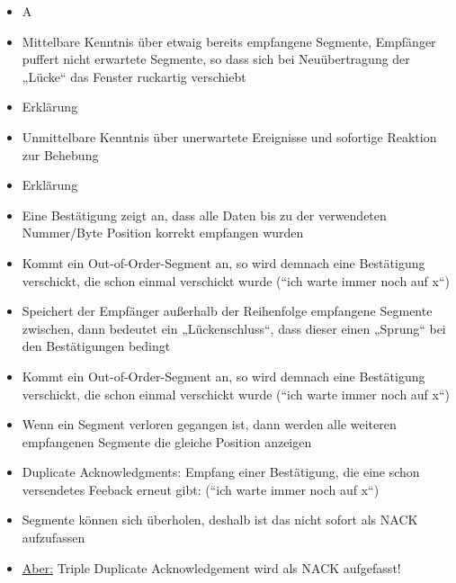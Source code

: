 \begin{itemize}
    \item \todo A
\end{itemize}

\begin{itemize}
    \item Mittelbare Kenntnis über etwaig bereits empfangene Segmente, Empfänger puffert nicht erwartete Segmente, so dass sich bei Neuübertragung der „Lücke“ das Fenster ruckartig verschiebt
    \item \todo Erklärung
\end{itemize}

\begin{itemize}
    \item Unmittelbare Kenntnis über unerwartete Ereignisse und sofortige Reaktion zur Behebung
    \item \todo Erklärung
\end{itemize}

\begin{itemize}
    \item Eine Bestätigung zeigt an, dass alle Daten bis zu der verwendeten Nummer/Byte Position korrekt empfangen wurden
    \item Kommt ein Out-of-Order-Segment an, so wird demnach eine Bestätigung verschickt, die schon einmal verschickt wurde (“ich warte immer noch auf x“)
    \item Speichert der Empfänger außerhalb der Reihenfolge empfangene Segmente zwischen, dann bedeutet ein „Lückenschluss“, dass dieser einen „Sprung“ bei den Bestätigungen bedingt
\end{itemize}

\begin{itemize}
    \item Kommt ein Out-of-Order-Segment an, so wird demnach eine Bestätigung verschickt, die schon einmal verschickt wurde (“ich warte immer noch auf x“)
    \item Wenn ein Segment verloren gegangen ist, dann werden alle weiteren empfangenen Segmente die gleiche Position anzeigen
    \item Duplicate Acknowledgments: Empfang einer Bestätigung, die eine schon versendetes Feeback erneut gibt: (“ich warte immer noch auf x“)
    \item Segmente können sich überholen, deshalb ist das nicht sofort als NACK aufzufassen
    \item \underline{Aber:} Triple Duplicate Acknowledgement wird als NACK aufgefasst!
\end{itemize}